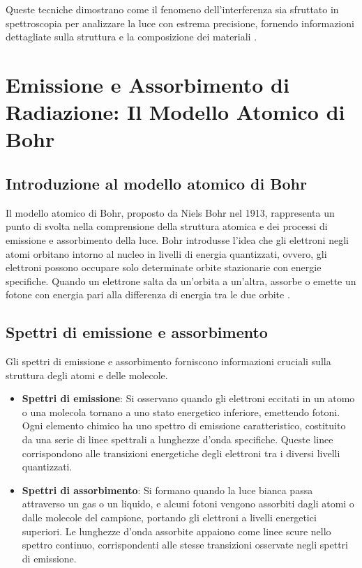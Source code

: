 \documentclass[12pt,a4paper]{report}
\begin{document}
Queste tecniche dimostrano come il fenomeno dell'interferenza sia sfruttato in spettroscopia per analizzare la luce con estrema precisione, fornendo informazioni dettagliate sulla struttura e la composizione dei materiali \cite{born1999principles}.

\section{Emissione e Assorbimento di Radiazione: Il Modello Atomico di Bohr}

\subsection{Introduzione al modello atomico di Bohr}

Il modello atomico di Bohr, proposto da Niels Bohr nel 1913, rappresenta un punto di svolta nella comprensione della struttura atomica e dei processi di emissione e assorbimento della luce. Bohr introdusse l'idea che gli elettroni negli atomi orbitano intorno al nucleo in livelli di energia quantizzati, ovvero, gli elettroni possono occupare solo determinate orbite stazionarie con energie specifiche. Quando un elettrone salta da un'orbita a un'altra, assorbe o emette un fotone con energia pari alla differenza di energia tra le due orbite \cite{bohr1913constitution}.

\subsection{Spettri di emissione e assorbimento}

Gli spettri di emissione e assorbimento forniscono informazioni cruciali sulla struttura degli atomi e delle molecole.

\begin{itemize}
\item \textbf{Spettri di emissione}: Si osservano quando gli elettroni eccitati in un atomo o una molecola tornano a uno stato energetico inferiore, emettendo fotoni. Ogni elemento chimico ha uno spettro di emissione caratteristico, costituito da una serie di linee spettrali a lunghezze d'onda specifiche. Queste linee corrispondono alle transizioni energetiche degli elettroni tra i diversi livelli quantizzati.
\item \textbf{Spettri di assorbimento}: Si formano quando la luce bianca passa attraverso un gas o un liquido, e alcuni fotoni vengono assorbiti dagli atomi o dalle molecole del campione, portando gli elettroni a livelli energetici superiori. Le lunghezze d'onda assorbite appaiono come linee scure nello spettro continuo, corrispondenti alle stesse transizioni osservate negli spettri di emissione.
\end{itemize}
\end{document}
